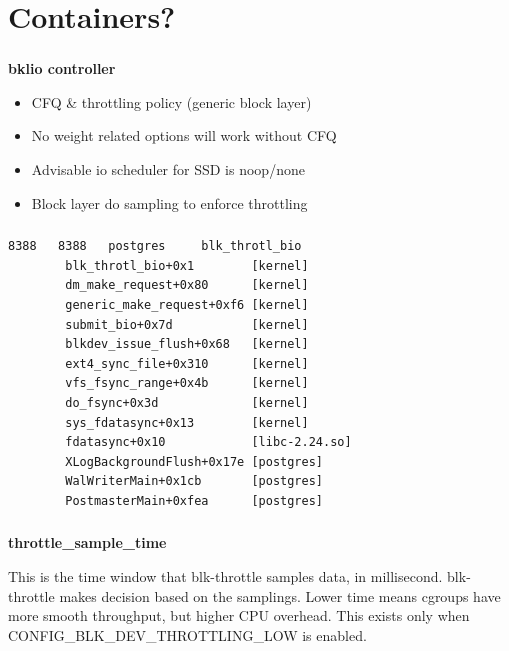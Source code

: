 \documentclass[usenames,dvipsnames, 18pt, compress, aspectratio=169]{beamer}
\begin{document}
\fontsize{13pt}{14}\selectfont
\section{Containers?}
\fontsize{17pt}{18}\selectfont

\begin{frame}
    \frametitle{}
    \begin{center}
    \textbf{bklio controller}

        \begin{itemize}[label={\MVRightarrow}]
            \item CFQ \& throttling policy (generic block layer)
            \item No weight related options will work without CFQ
            \item Advisable io scheduler for SSD is noop/none
            \item Block layer do sampling to enforce throttling
        \end{itemize}

    \end{center}
\end{frame}

\begin{frame}[fragile]{}
    \frametitle{}
    \begin{center}

        \vspace{0.3cm}
        \begin{verbatim}
8388   8388   postgres     blk_throtl_bio
        blk_throtl_bio+0x1        [kernel]
        dm_make_request+0x80      [kernel]
        generic_make_request+0xf6 [kernel]
        submit_bio+0x7d           [kernel]
        blkdev_issue_flush+0x68   [kernel]
        ext4_sync_file+0x310      [kernel]
        vfs_fsync_range+0x4b      [kernel]
        do_fsync+0x3d             [kernel]
        sys_fdatasync+0x13        [kernel]
        fdatasync+0x10            [libc-2.24.so]
        XLogBackgroundFlush+0x17e [postgres]
        WalWriterMain+0x1cb       [postgres]
        PostmasterMain+0xfea      [postgres]
        \end{verbatim}

    \end{center}
\end{frame}

\begin{frame}
    \frametitle{}
    \begin{center}
    \textbf{throttle\_sample\_time}

		\begin{flushleft}
		This is the time window that blk-throttle samples data, in millisecond.
		blk-throttle makes decision based on the samplings. Lower time means cgroups
		have more smooth throughput, but higher CPU overhead. This exists only when
		CONFIG\_BLK\_DEV\_THROTTLING\_LOW is enabled.
		\end{flushleft}

    \end{center}
\end{frame}
\end{document}
